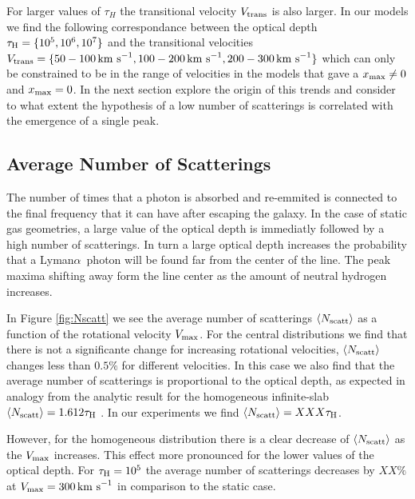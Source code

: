 \documentclass[usenatbib]{mn2e}
\newcommand{\ly}{{\ifmmode{{\rm Ly}\alpha~}\else{Ly$\alpha$~}\fi}}
\newcommand{\lya}{{Lyman$\alpha$~}}
\newcommand{\kms}{{\ifmmode{{\mathrm{\,km\ s}^{-1}}}\else{\,km~s$^{-1}$}\fi}}
\begin{document}
For larger values of $\tau_{H}$ the transitional velocity $V_{\rm
  trans}$ is also larger. In our models we find the following
correspondance between the optical depth $\tau_{\rm H}=\{10^5, 10^6,
10^7\}$ and the transitional velocities $V_{\rm
  trans}=\{50-100\kms, 100-200\kms, 200-300\kms\}$ which can only be
constrained to be in the range of velocities in the models that gave a $x_{\rm
  max}\neq 0$ and $x_{\rm max}=0$.   In the next section explore the
origin of this trends and consider to what extent the hypothesis of a low
number of scatterings is correlated with the emergence of a single
peak. 



\subsection{Average Number of Scatterings}

The number of times that a \ly photon is absorbed and re-emmited is
connected to the final frequency that it can have after escaping the
galaxy. In the case of static gas geometries, a large value of the
optical depth is immediatly followed by a high number of
scatterings. In turn a large optical depth increases the probability
that a \lya photon will be found far from the center of the line. The
peak maxima shifting away form the line center as the amount of
neutral hydrogen increases.


In Figure \ref{fig:Nscatt} we see the average number of scatterings
$\langle N_{\rm scatt}\rangle$ as a function of the rotational velocity
$V_{\rm max}$. For the central distributions we find that there is not
a significante change for increasing rotational
velocities, $\langle N_{\rm scatt}\rangle$ changes less than $0.5\%$
for different velocities. In this case we also find that the average
number of scatterings is proportional to the optical depth, as
expected in analogy from the analytic result for the homogeneous
infinite-slab $\langle N_{\rm  scatt}\rangle=1.612\tau_{\rm   H}$
\citep{Adams72,Harrington73}. In our experiments we find  $\langle N_{\rm
  scatt}\rangle= XXX\tau_{\rm   H}$. 


However, for the homogeneous distribution there is a clear decrease of
$\langle N_{\rm  scatt}\rangle$ as the  $V_{\rm max}$ increases. This
effect more pronounced for the lower values of the optical depth. For
$\tau_{\rm H}=10^5$ the average number of scatterings decreases by
$XX\%$ at $V_{\rm max}=300\kms$ in comparison to the static case.
\end{document}
